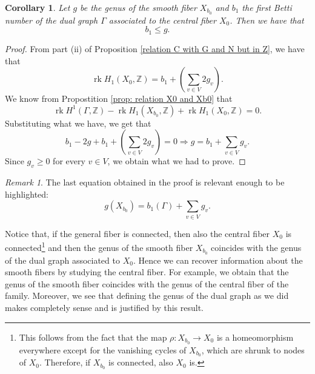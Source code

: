 \documentclass[a4paper,12 pt,titlepage,twoside]{book}
\newcommand{\numberset}{\mathbb}
\newcommand{\Z}{\numberset{Z}}
\DeclareMathOperator{\rk}{rk}
\theoremstyle{plain}
\theoremstyle{theorem}
\newtheorem{cor}[thm]{Corollary}
\theoremstyle{definition}
\theoremstyle{remark}
\newtheorem{oss}[thm]{Remark}
\begin{document}
	\begin{cor}\label{cor: b1 le g}
		Let $g$ be the genus of the smooth fiber $X_{b_0}$ and $b_1$ the first Betti number of the dual graph $\Gamma$ associated to the central fiber $X_0$. Then we have that $$b_1 \le g.$$
	\end{cor}
	\begin{proof}
		From part (ii) of Proposition \ref{relation C with G and N but in Z}, we have that $$\rk H_1(X_0,\Z) = b_1 + \left(\sum_{v \in V} 2g_v\right).$$ We know from Propostition \ref{prop: relation X0 and Xb0} that $$\rk H^1(\Gamma,\Z) - \rk H_1(X_{b_0},\Z) + \rk H_1(X_0,\Z) = 0.$$ Substituting what we have, we get that $$b_1 - 2g + b_1 + \left(\sum_{v \in V} 2g_v\right) = 0 \Rightarrow g = b_1 + \sum_{v \in V} g_v.$$ Since $g_v \ge 0$ for every $v \in V$, we obtain what we had to prove.
	\end{proof}
	\begin{oss}
		The last equation obtained in the proof is relevant enough to be highlighted: \begin{equation}\label{eq: relation between genera of Xb0, b1Gamma and sum Xv}
		g(X_{b_0}) = b_1(\Gamma) + \sum_{v \in V} g_v.
		\end{equation}
	\end{oss}
	Notice that, if the general fiber is connected, then also the central fiber $X_0$ is connected\footnote{This follows from the fact that the map $\rho \colon X_{b_0} \rightarrow X_0$ is a homeomorphism everywhere except for the vanishing cycles of $X_{b_0}$, which are shrunk to nodes of $X_0$. Therefore, if $X_{b_0}$ is connected, also $X_0$ is.} and then the genus of the smooth fiber $X_{b_0}$ coincides with the genus of the dual graph associated to $X_0$. Hence we can recover information about the smooth fibers by studying the central fiber. For example, we obtain that the genus of the smooth fiber coincides with the genus of the central fiber of the family. Moreover, we see that defining the genus of the dual graph as we did makes completely sense and is justified by this result.
\end{document}
